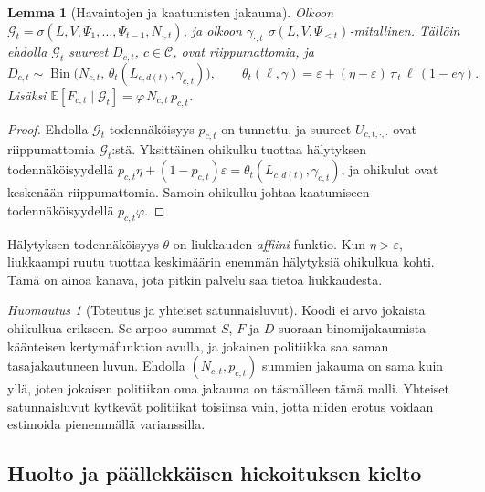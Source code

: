 \documentclass[11pt,a4paper]{article}
\theoremstyle{plain}
\newtheorem{lemma}{Lemma}
\theoremstyle{definition}
\theoremstyle{remark}
\newtheorem{huomautus}{Huomautus}
\newcommand{\E}{\mathbb{E}}
\newcommand{\cC}{\mathcal{C}}
\newcommand{\cG}{\mathcal{G}}
\newcommand{\1}{\mathbf{1}}
\newcommand{\Bin}{\operatorname{Bin}}
\begin{document}
\begin{lemma}[Havaintojen ja kaatumisten jakauma]\label{le:havainnot}
Olkoon $\cG_t = \sigma(L, V, \Psi_1, \dots, \Psi_{t-1}, N_{\cdot,t})$, ja olkoon
$\gamma_{\cdot,t}$ $\sigma(L, V, \Psi_{<t})$-mitallinen. Tällöin ehdolla $\cG_t$
suureet $D_{c,t}$, $c \in \cC$, ovat riippumattomia, ja
\[
  D_{c,t} \sim \Bin\bigl(N_{c,t},\, \theta_t(L_{c,d(t)}, \gamma_{c,t})\bigr),
  \qquad
  \theta_t(\ell, \gamma) = \varepsilon + (\eta - \varepsilon)\, \pi_t\, \ell\, (1 - e \gamma).
\]
Lisäksi $\E[F_{c,t} \mid \cG_t] = \varphi\, N_{c,t}\, p_{c,t}$.
\end{lemma}

\begin{proof}
Ehdolla $\cG_t$ todennäköisyys $p_{c,t}$ on tunnettu, ja suureet
$U_{c,t,\cdot,\cdot}$ ovat riippumattomia $\cG_t$:stä. Yksittäinen ohikulku
tuottaa hälytyksen todennäköisyydellä
$p_{c,t}\eta + (1 - p_{c,t})\varepsilon = \theta_t(L_{c,d(t)}, \gamma_{c,t})$, ja
ohikulut ovat keskenään riippumattomia. Samoin ohikulku johtaa kaatumiseen
todennäköisyydellä $p_{c,t}\varphi$.
\end{proof}

\begin{intuitio}
Hälytyksen todennäköisyys $\theta$ on liukkauden \emph{affiini} funktio. Kun
$\eta > \varepsilon$, liukkaampi ruutu tuottaa keskimäärin enemmän hälytyksiä
ohikulkua kohti. Tämä on ainoa kanava, jota pitkin palvelu saa tietoa
liukkaudesta.
\end{intuitio}

\begin{huomautus}[Toteutus ja yhteiset satunnaisluvut]\label{hu:crn}
Koodi ei arvo jokaista ohikulkua erikseen. Se arpoo summat $S$, $F$ ja $D$
suoraan binomijakaumista käänteisen kertymäfunktion avulla, ja jokainen
politiikka saa saman tasajakautuneen luvun. Ehdolla $(N_{c,t}, p_{c,t})$
summien jakauma on sama kuin yllä, joten jokaisen politiikan oma jakauma on
täsmälleen tämä malli. Yhteiset satunnaisluvut kytkevät politiikat toisiinsa
vain, jotta niiden erotus voidaan estimoida pienemmällä varianssilla.
\end{huomautus}

\subsection{Huolto ja päällekkäisen hiekoituksen kielto}\label{sec:huolto}
\end{document}

